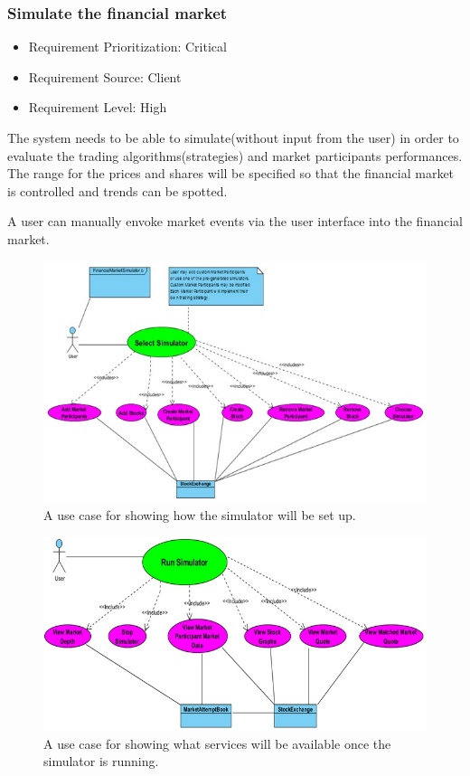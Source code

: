 \documentclass[12pt]{article}
\begin{document}
			\subsubsection{Simulate the financial market}
			\begin{itemize}
				\item Requirement Prioritization: Critical
				\item Requirement Source: Client 
				\item Requirement Level: High	
			\end{itemize}
						
			The system needs to be able to simulate(without input from the user) in order to evaluate the trading algorithms(strategies) and market participants performances. The range for the prices and shares will be specified so that the financial market is controlled and trends can be spotted. 
			
			A user can manually envoke market events via the user interface into the financial market.
			
			\begin{figure}[th]
			\centering
			\includegraphics[scale=0.8]{./USE_CASE_Select_Simulator_Financial_Market_Simulator}
			\caption{A use case for showing how the simulator will be set up.}
			\label{domain objects}
			\end{figure}
				
			\begin{figure}[th!]
			\centering
			\includegraphics[scale=0.8]{./USE_CASE_Run_Simulator_Financial_Market_Simulator}
			\caption{A use case for showing what services will be available once the simulator is running.}
			\label{domain objects}
			\end{figure}
	
\end{document}
